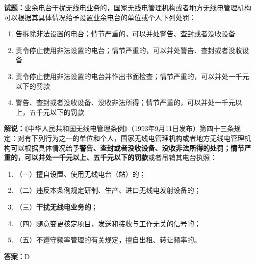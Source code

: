 \documentclass{ctexbook}
\begin{document}

\bigskip

\noindent\textbf{试题：}业余电台干扰无线电业务的，国家无线电管理机构或者地方无线电管理机构可以根据其具体情况给予设置业余电台的单位或个人下列处罚：
\begin{enumerate}[leftmargin=3em]
  \item  告拆除非法设置的电台；情节严重的，可以并处警告、查封或者没收设备
  \item  责令停止使用非法设置的电台；情节严重的，可以并处警告、查封或者没收设备
  \item  责令停止使用非法设置的电台并作出书面检查；情节严重的，可以并处一千元以下的罚款
  \item  警告、查封或者没收设备、没收非法所得；情节严重的，可以并处一千元以上，五千元以下的罚款
\end{enumerate}
\noindent\textbf{解说：}《中华人民共和国无线电管理条例》（1993年9月11日发布）第四十三条规定：对有下列行为之一的单位和个人，国家无线电管理机构或者地方无线电管理机构可以根据具体情况给予\textbf{警告、查封或者没收设备、没收非法所得的处罚；情节严重的，可以并处一千元以上、五千元以下的罚款}或者吊销其电台执照：
\begin{enumerate}[leftmargin=3em, label=]
  \item（一）擅自设置、使用无线电台（站）的；
  \item（二）违反本条例规定研制、生产、进口无线电发射设备的；
  \item（三）\textbf{干扰无线电业务的}；
  \item（四）随意变更核定项目，发送和接收与工作无关的信号的；
  \item（五）不遵守频率管理的有关规定，擅自出租、转让频率的。
\end{enumerate}
\textbf{答案：}D

\bigskip
\end{document}
